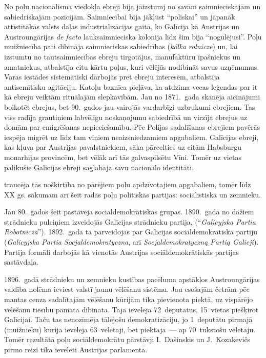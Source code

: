 \documentclass[twoside,a5paper,12pt,fleqn,openany]{extbook}
\newcommand{\pltxti}[1]{\textit{\textpolish{#1}}}
\newcommand{\latxti}[1]{\textit{\textlatin{#1}}}
\begin{document}
No poļu nacionālisma viedokļa ebreji bija jāizstumj no savām saimnieciskajām un sabiedriskajām pozīcijām. Saimniecībai bija jākļūst ``poliskai'' un jāpanāk attīstītākās valsts daļas industrializācijas gaitā, ko Galīcija kā Austrijas un Austroungārijas \latxti{de facto} lauksaimnieciska kolonija līdz šim bija ``nogulējusi''. Poļu muižniecība pati dibināja saimnieciskas sabiedrības (\pltxti{kólka rolnicze}) un, lai izstumtu no tautsaimniecības ebreju tirgotājus, manufaktūru īpašniekus un amatniekus, atbalstīja citu kārtu poļus, kuri vēlējās nodibināt savus uzņēmumus. Varas iestādes sistemātiski darbojās pret ebreju interesēm, atbalstīja antisemītisku aģitāciju. Katoļu baznīca pieļāva, ka atdzima vecas leģendas par it kā ebreju veiktām rituālajām slepkavībām. Jau no 1871.~gada skanēja aicinājumi boikotēt ebrejus, bet 90.~gados jau vairojās vardarbīgi uzbrukumi ebrejiem. Tas viss radīja grautiņiem labvēlīgu noskaņojumu sabiedrībā un virzīja ebrejus uz domām par emigrēšanas nepieciešamību. Pēc Polijas sadalīšanas ebrejiem pavērās iespēja migrēt uz līdz tam viņiem neaizsniedzamiem apgabaliem. Galīcijas ebreji, kas kļuva par Austrijas pavalstniekiem, sāka pārcelties uz citām Habsburgu monarhijas provincēm, bet vēlāk arī tās galvaspilsētu Vīni. Tomēr uz vietas palikušie Galīcijas ebreji saglabāja savu nacionālo identitāti.

 traucēja tās nošķirtība no pārējiem poļu apdzīvotajiem apgabaliem, tomēr līdz XX gs. sākumam arī šeit radās poļu politiskās partijas: sociālistiskā un zemnieku.

Jau 80.~gados šeit pastāvēja sociāldemokrātiskas grupas. 1890.~gadā no dažiem strādnieku pulciņiem izveidojās Galīcijas strādnieku partija, (``\pltxti{Galicyjska Partia Robotnicza}''). 1892.~gadā tā pārveidojās par Galīcijas sociāldemokrātiskā partiju (\pltxti{Galicyjska Partia Socjaldemokratyczna}, arī \pltxti{Socjaldemokratyczną Partią Galicji}). Partija formāli darbojās kā vienotās Austrijas sociāldemokrātiskās partijas sastāvdaļa.

1896.~gadā strādnieku un zemnieku kustības pacēluma apstākļos Austroungārijas valdība nolēma ieviest valstī jaunu vēlēšanu sistēmu. Jau esošajām četrām pēc mantas cenza sadalītajām vēlēšanu kūrijām tika pievienota piektā, uz vispārējo vēlēšanu tiesību pamata dibināta. Tajā ievēlēja 72~deputātus, 15~vietas piešķirot Galīcijai. Taču tas nenozīmēja tālejošu demokratizāciju, jo 1~deputātu pirmajā (muižnieku) kūrijā ievēlēja 63~vēlētāji, bet piektajā~--- ap 70~tūkstošu vēlētāju. Tomēr rezultātā poļu sociāldemokrātu pārstāvji I.~Dašinskis un J.~Kozakevičs pirmo reizi tika ievēlēti Austrijas parlamentā.
\end{document}
